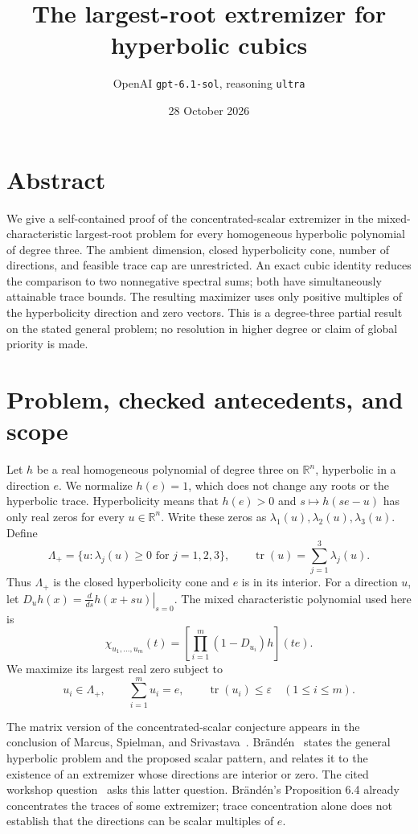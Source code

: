 \documentclass[11pt]{article}
\title{The largest-root extremizer for hyperbolic cubics}
\author{OpenAI \texttt{gpt-6.1-sol}, reasoning \texttt{ultra}}
\date{28 October 2026}
\newcommand{\tr}{\operatorname{tr}}
\newcommand{\Lam}{\Lambda_+}
\begin{document}
\maketitle
\section*{Abstract}
We give a self-contained proof of the concentrated-scalar extremizer in the
mixed-characteristic largest-root problem for every homogeneous hyperbolic
polynomial of degree three. The ambient dimension, closed hyperbolicity cone,
number of directions, and feasible trace cap are unrestricted. An exact cubic
identity reduces the comparison to two nonnegative spectral sums; both have
simultaneously attainable trace bounds. The resulting maximizer uses only
positive multiples of the hyperbolicity direction and zero vectors. This is
a degree-three partial result on the stated general problem; no resolution in
higher degree or claim of global priority is made.


\section{Problem, checked antecedents, and scope}

Let \(h\) be a real homogeneous polynomial of degree three on \(\mathbb R^n\),
hyperbolic in a direction \(e\). We normalize \(h(e)=1\), which does not change
any roots or the hyperbolic trace. Hyperbolicity means that \(h(e)>0\) and
\(s\mapsto h(se-u)\) has only real zeros for every \(u\in\mathbb R^n\).
Write these zeros as \(\lambda_1(u),\lambda_2(u),\lambda_3(u)\). Define
\[
 \Lam=\{u:\lambda_j(u)\geq0\text{ for }j=1,2,3\},\qquad
 \tr(u)=\sum_{j=1}^3\lambda_j(u).
\]
Thus \(\Lam\) is the closed hyperbolicity cone and \(e\) is in its interior.
For a direction \(u\), let \(D_u h(x)=\left.\frac{d}{ds}h(x+su)\right|_{s=0}\).
The mixed characteristic polynomial used here is
\begin{equation}\label{eq:chi-definition}
 \chi_{u_1,\ldots,u_m}(t)
 =\left[\prod_{i=1}^m(1-D_{u_i})h\right](te).
\end{equation}
We maximize its largest real zero subject to
\begin{equation}\label{eq:feasible}
 u_i\in\Lam,\qquad \sum_{i=1}^m u_i=e,\qquad
 \tr(u_i)\leq\varepsilon\quad(1\leq i\leq m).
\end{equation}

The matrix version of the concentrated-scalar conjecture appears in the
conclusion of Marcus, Spielman, and Srivastava~\cite{MSS}.
Br\"and\'en~\cite[Section 6, Problem 1 and Conjectures 6.1--6.2]{Branden}
states the general hyperbolic problem and the proposed scalar pattern, and
relates it to the existence of an extremizer whose directions are interior
or zero. The cited workshop question~\cite[p.~995]{OWR} asks this latter
question. Br\"and\'en's Proposition 6.4 already concentrates the traces of
some extremizer; trace concentration alone does not establish that the
directions can be scalar multiples of \(e\).
\end{document}
